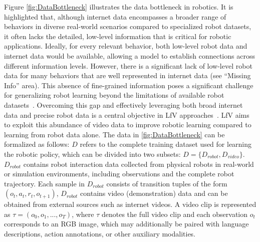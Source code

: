 Figure \ref{fig:DataBottleneck} illustrates the data bottleneck in robotics. It is highlighted that, although internet data encompasses a broader range of behaviors in diverse real-world scenarios compared to specialized robot datasets, it often lacks the detailed, low-level information that is critical for robotic applications.  
Ideally, for every relevant behavior, both low-level robot data and internet data would be available, allowing a model to establish connections across different information levels. However, there is a significant lack of low-level robot data for many behaviors that are well represented in internet data (see ``Missing Info'' area). 
This absence of fine-grained information poses a significant challenge for generalizing robot learning beyond the limitations of available robot datasets~\cite{McCarthy_2025}. Overcoming this gap and effectively leveraging both broad internet data and precise robot data is a central objective in \ac{LfV} approaches~\cite{McCarthy_2025}.
\ac{LfV} aims to exploit this abundance of video data to improve robotic learning compared to learning from robot data alone. 
The data in \autoref{fig:DataBottleneck} can be formalized as follows: $D$ refers to the complete training dataset used for learning the robotic policy, which can be divided into two subsets: $D = \{D_{robot}, D_{video}\}$. 
$D_{robot}$ contains robot interaction data collected from physical robots in real-world or simulation environments, including observations and the complete robot trajectory. Each sample in $D_{robot}$ consists of transition tuples of the form $(o_t, a_t, r_t, o_{t+1})$, 
$D_{robot}$ contains video (demonstration) data and can be obtained from external sources such as internet videos. A video clip is represented as $\tau=(o_0, o_1, ..., o_T)$, where $\tau$ denotes the full video clip and each observation $o_t$ corresponds to an RGB image, which may additionally be paired with language descriptions, action annotations, or other auxiliary modalities.


